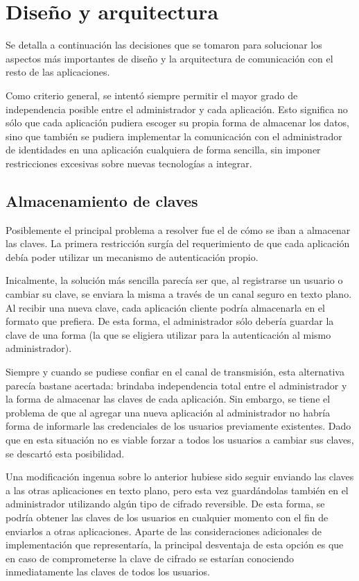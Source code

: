 \section{Diseño y arquitectura}

Se detalla a continuación las decisiones que se tomaron para solucionar los aspectos más importantes de diseño
y la arquitectura de comunicación con el resto de las aplicaciones.

Como criterio general, se intentó siempre permitir el mayor grado de independencia posible entre el administrador
y cada aplicación. Esto significa no sólo que cada aplicación pudiera escoger su propia forma de almacenar los
datos, sino que también se pudiera implementar la comunicación con el administrador de identidades en una aplicación
cualquiera de forma sencilla, sin imponer restricciones excesivas sobre nuevas tecnologías a integrar.

\subsection{Almacenamiento de claves}

Posiblemente el principal problema a resolver fue el de cómo se iban a almacenar las claves. La primera restricción
surgía del requerimiento de que cada aplicación debía poder utilizar un mecanismo de autenticación propio.

Inicalmente, la solución más sencilla parecía ser que, al registrarse un usuario o cambiar su clave, se enviara
la misma a través de un canal seguro en texto plano. Al recibir una nueva clave, cada aplicación cliente podría
almacenarla en el formato que prefiera. De esta forma, el administrador sólo debería guardar la clave de una forma
(la que se eligiera utilizar para la autenticación al mismo administrador).

Siempre y cuando se pudiese confiar en el canal de transmisión, esta alternativa parecía bastane acertada:
brindaba independencia total entre el administrador y la forma de almacenar las claves de cada aplicación.
Sin embargo, se tiene el problema de que al agregar una nueva aplicación al administrador no habría forma de
informarle las credenciales de los usuarios previamente existentes. Dado que en esta situación no es viable
forzar a todos los usuarios a cambiar sus claves, se descartó esta posibilidad.

Una modificación ingenua sobre lo anterior hubiese sido seguir enviando las claves a las otras aplicaciones 
en texto plano, pero esta vez guardándolas también en el administrador utilizando algún tipo de cifrado reversible.
De esta forma, se podría obtener las claves de los usuarios en cualquier momento con el fin de enviarlos a
otras aplicaciones. Aparte de las consideraciones adicionales de implementación que representaría, la principal
desventaja de esta opción es que en caso de comprometerse la clave de cifrado se estarían conociendo inmediatamente
las claves de todos los usuarios.

